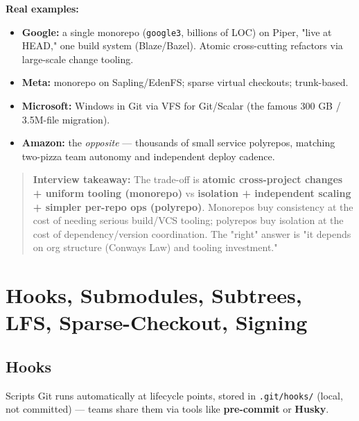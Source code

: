 \documentclass[11pt]{article}
\providecommand{\tightlist}{\setlength{\itemsep}{1pt}\setlength{\parskip}{0pt}}
\begin{document}
\textbf{Real examples:}

\begin{itemize}
\tightlist
\item
  \textbf{Google:} a single monorepo (\texttt{google3}, billions of LOC) on Piper, "live at HEAD," one build system (Blaze/Bazel). Atomic cross-cutting refactors via large-scale change tooling.
\item
  \textbf{Meta:} monorepo on Sapling/EdenFS; sparse virtual checkouts; trunk-based.
\item
  \textbf{Microsoft:} Windows in Git via VFS for Git/Scalar (the famous 300 GB / 3.5M-file migration).
\item
  \textbf{Amazon:} the \emph{opposite} --- thousands of small service polyrepos, matching two-pizza team autonomy and independent deploy cadence.
\end{itemize}

\begin{quote}
\textbf{Interview takeaway:} The trade-off is \textbf{atomic cross-project changes + uniform tooling (monorepo)} vs \textbf{isolation + independent scaling + simpler per-repo ops (polyrepo)}. Monorepos buy consistency at the cost of needing serious build/VCS tooling; polyrepos buy isolation at the cost of dependency/version coordination. The "right" answer is "it depends on org structure (Conway\textquotesingle s Law) and tooling investment."
\end{quote}

\section{Hooks, Submodules, Subtrees, LFS, Sparse-Checkout, Signing}\label{hooks-submodules-subtrees-lfs-sparse-checkout-signing}

\subsection{Hooks}\label{hooks}

Scripts Git runs automatically at lifecycle points, stored in \texttt{.git/hooks/} (local, not committed) --- teams share them via tools like \textbf{pre-commit} or \textbf{Husky}.
\end{document}

